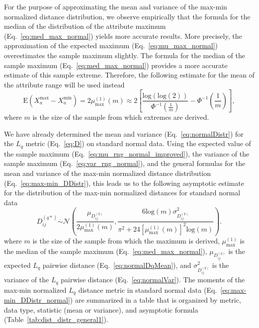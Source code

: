 \documentclass[aoas]{imsart}
\begin{document}
For the purpose of approximating the mean and variance of the max-min normalized distance distribution, we observe empirically that the formula for the median of the distribution of the attribute maximum (Eq.~\ref{eq:med_max_normal}) yields more accurate results. More precisely, the approximation of the expected maximum (Eq.~\ref{eq:mu_max_normal}) overestimates the sample maximum slightly. The formula for the median of the sample maximum (Eq.~\ref{eq:med_max_normal}) provides a more accurate estimate of this sample extreme. Therefore, the following estimate for the mean of the attribute range will be used instead
%
\begin{equation}\label{eq:mu_rng_normal_improved}
\text{E}(X^\text{max}_a - X^\text{min}_a) = 2\mu^{(1)}_\text{max}(m) \approx 2\left[\frac{\text{log}(\text{log}(2))}{\Phi^{-1}\left(\frac{1}{m}\right)} - \Phi^{-1}\left(\frac{1}{m}\right)\right],
\end{equation}
%
where $m$ is the size of the sample from which extremes are derived.

We have already determined the mean and variance (Eq.~\ref{eq:normalDistr}) for the $L_q$ metric (Eq.~\ref{eq:D}) on standard normal data. Using the expected value of the sample maximum (Eq.~\ref{eq:mu_rng_normal_improved}), the variance of the sample maximum (Eq.~\ref{eq:var_rng_normal}), and the general formulas for the mean and variance of the max-min normalized distance distribution (Eq.~\ref{eq:max-min_DDistr}), this leads us to the following asymptotic estimate for the distribution of the max-min normalized distances for standard normal data
%
\begin{equation}\label{eq:max-min_DDistr_normal}
D^{(q*)}_{ij} \overset{.}{\sim} \mathcal{N}\left(\frac{\mu_{D^{(q)}_{ij}}}{2\mu^{(1)}_\text{max}(m)}, \frac{6 \text{log}(m) \sigma^2_{D^{(q)}_{ij}}}{\pi^2 + 24 \left[\mu^{(1)}_\text{max}(m)\right]^2 \text{log}(m)}\right).
\end{equation}
%
where $m$ is the size of the sample from which the maximum is derived, $\mu^{(1)}_\text{max}$ is the median of the sample maximum (Eq.~\ref{eq:med_max_normal}), $\mu_{D^{(q)}_{ij}}$ is the expected $L_q$ pairwise distance (Eq.~\ref{eq:normalDqMean}), and $\sigma^2_{D^{(q)}_{ij}}$ is the variance of the $L_q$ pairwise distance (Eq.~\ref{eq:normalVar}). The moments of the max-min normalized $L_q$ distance metric in standard normal data (Eq.~\ref{eq:max-min_DDistr_normal}) are summarized in a table that is organized by metric, data type, statistic (mean or variance), and asymptotic formula (Table~\ref{tab:dist_distr_general1}).
\end{document}
